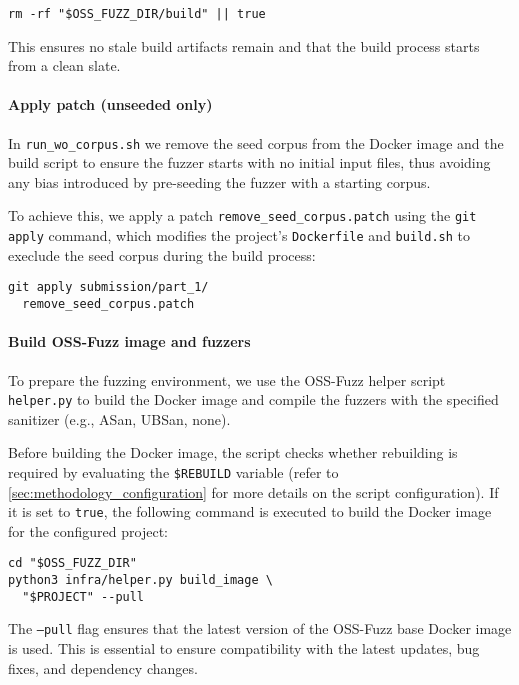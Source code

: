 \begin{verbatim}
rm -rf "$OSS_FUZZ_DIR/build" || true
\end{verbatim}

This ensures no stale build artifacts remain and that the build process starts from a clean slate.

\noindent \paragraph{Apply patch (unseeded only)} In \texttt{run\_wo\_corpus.sh} we remove the seed corpus from the Docker image and the build script to ensure the fuzzer starts with no initial input files, thus avoiding any bias introduced by pre-seeding the fuzzer with a starting corpus.

To achieve this, we apply a patch \texttt{remove\_seed\_corpus.patch} using the \texttt{git apply} command, which modifies the project's \texttt{Dockerfile} and \texttt{build.sh} to execlude the seed corpus during the build process:

\begin{verbatim}
git apply submission/part_1/
  remove_seed_corpus.patch
\end{verbatim}

\noindent \paragraph{Build OSS-Fuzz image and fuzzers} To prepare the fuzzing environment, we use the OSS-Fuzz helper script \texttt{helper.py} to build the Docker image and compile the fuzzers with the specified sanitizer (e.g., ASan, UBSan, none).

Before building the Docker image, the script checks whether rebuilding is required by evaluating the \texttt{\$REBUILD} variable (refer to \autoref{sec:methodology_configuration} for more details on the script configuration). If it is set to \texttt{true}, the following command is executed to build the Docker image for the configured project:

\begin{verbatim}
cd "$OSS_FUZZ_DIR"
python3 infra/helper.py build_image \
  "$PROJECT" --pull
\end{verbatim}

The \texttt{---pull} flag ensures that the latest version of the OSS-Fuzz base Docker image is used. This is essential to ensure compatibility with the latest updates, bug fixes, and dependency changes.


